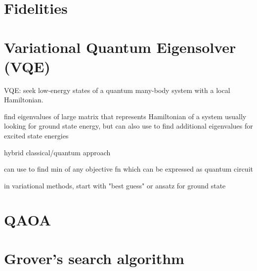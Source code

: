 \documentclass[a4paper,landscape,columns=3]{CheatSheet}
\begin{document}

\section{Fidelities}


\section{Variational Quantum Eigensolver (VQE)}


VQE: seek low-energy states of a quantum many-body system with a local Hamiltonian.

find eigenvalues of large matrix that represents Hamiltonian of a system
usually looking for ground state energy, but can also use to find additional eigenvalues for excited state energies

hybrid classical/quantum approach

can use to find min of any objective fn which can be expressed as quantum circuit

in variational methods, start with "best guess" or ansatz for ground state





\section{QAOA}

\section{Grover's search algorithm}
\end{document}
